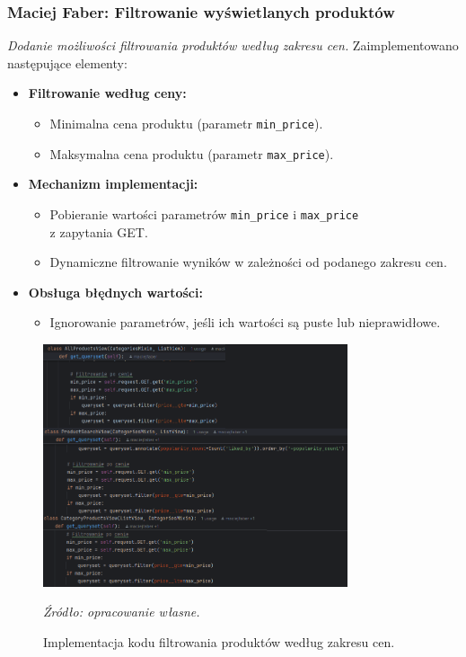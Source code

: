 \documentclass[12pt,a4paper,oneside]{article}
\theoremstyle{definition}
\numberwithin{equation}{section}
\begin{document}
\subsubsection{Maciej Faber: Filtrowanie wyświetlanych produktów}
\label{section:1.3.45}
\textit{
Dodanie możliwości filtrowania produktów według zakresu cen.
}
Zaimplementowano następujące elementy:
\begin{itemize}
    \item \textbf{Filtrowanie według ceny:}
    \begin{itemize}
        \item Minimalna cena produktu (parametr \texttt{min\_price}).
        \item Maksymalna cena produktu (parametr \texttt{max\_price}).
    \end{itemize}
    \item \textbf{Mechanizm implementacji:}
    \begin{itemize}
        \item Pobieranie wartości parametrów \texttt{min\_price} i \texttt{max\_price}\\ z zapytania GET.
        \item Dynamiczne filtrowanie wyników w zależności od podanego zakresu cen.
    \end{itemize}
    \item \textbf{Obsługa błędnych wartości:}
    \begin{itemize}
        \item Ignorowanie parametrów, jeśli ich wartości są puste lub nieprawidłowe.
    \end{itemize}
\end{itemize}
\begin{figure}[H]
    \centering
    \includegraphics[width=0.8\textwidth]{images/krzysztofBImages/filter_price.png}
    \caption{Implementacja kodu filtrowania produktów według zakresu cen.}
    \emph{Źródło: opracowanie własne.}
    \label{fig:filtering_products}
\end{figure}
\end{document}
